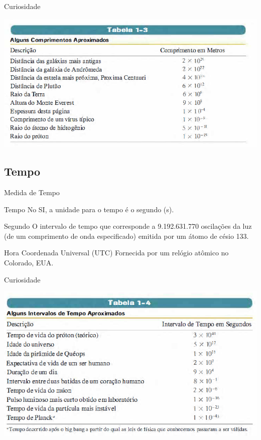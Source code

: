 \documentclass[xcolor=dvipsnames,table]{beamer}
\begin{document}
	\begin{frame}{Curiosidade}
		\begin{center}
			\includegraphics[scale=0.5]{images/tabela1-3.png}
		\end{center}
	\end{frame}
	
	\subsection{Tempo}
	\begin{frame}{Medida de Tempo}
		\begin{block}{Tempo}
			No SI, a unidade para o tempo é o segundo (s).
		\end{block} \pause
		\begin{block}{Segundo}
			O intervalo de tempo que corresponde a 9.192.631.770 oscilações da luz (de um comprimento de onda especificado) emitida por um átomo de césio 133.
		\end{block} \pause
		\begin{block}{Hora Coordenada Universal (UTC)}
			Fornecida por um relógio atômico no Colorado, EUA.
		\end{block}
	\end{frame}
	
	\begin{frame}{Curiosidade}
		\begin{center}
			\includegraphics[scale=0.5]{images/tabela1-4.png}
		\end{center}
	\end{frame}
	
\end{document}
